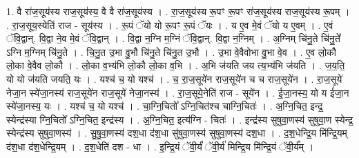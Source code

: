 \documentclass[17pt]{extarticle}
\begin{document}
1. वै रा॑ज॒सूय॑स्य राज॒सूय॑स्य॒ वै वै रा॑ज॒सूय॑स्य । . रा॒ज॒सूय॑स्य रू॒पꣳ रू॒पꣳ रा॑ज॒सूय॑स्य राज॒सूय॑स्य रू॒पम् । . रा॒ज॒सूय॒स्येति॑ राज - सूय॑स्य । . रू॒पं ॅयो यो रू॒पꣳ रू॒पं ॅयः । . य ए॒व मे॒वं ॅयो य ए॒वम् । . ए॒वं ॅवि॒द्वान्. वि॒द्वा ने॒व मे॒वं ॅवि॒द्वान् । . वि॒द्वा न॒ग्नि म॒ग्निं ॅवि॒द्वान्. वि॒द्वा न॒ग्निम् । . अ॒ग्निम् चि॑नु॒ते चि॑नु॒ते᳚ ऽग्नि म॒ग्निम् चि॑नु॒ते । . चि॒नु॒त उ॒भा वु॒भौ चि॑नु॒ते चि॑नु॒त उ॒भौ । . उ॒भा वे॒वैवोभा वु॒भा वे॒व । . ए॒व लो॒कौ लो॒का वे॒वैव लो॒कौ । . लो॒का व॒भ्य॑भि लो॒कौ लो॒का व॒भि । . अ॒भि ज॑यति जय त्य॒भ्य॑भि ज॑यति । . ज॒य॒ति॒ यो यो ज॑यति जयति॒ यः । . यश्च॑ च॒ यो यश्च॑ । . च॒ रा॒ज॒सूये॑न राज॒सूये॑न च च राज॒सूये॑न । . रा॒ज॒सूये॑ नेजा॒न स्ये॑जा॒नस्य॑ राज॒सूये॑न राज॒सूये॑ नेजा॒नस्य॑ । . रा॒ज॒सूये॒नेति॑ राज - सूये॑न । . ई॒जा॒नस्य॒ यो य ई॑जा॒न स्ये॑जा॒नस्य॒ यः । . यश्च॑ च॒ यो यश्च॑ । . चा॒ग्नि॒चितो᳚ ऽग्नि॒चित॑श्च चाग्नि॒चितः॑ । . अ॒ग्नि॒चित॒ इन्द्र॒ स्येन्द्र॑स्या ग्नि॒चितो᳚ ऽग्नि॒चित॒ इन्द्र॑स्य । . अ॒ग्नि॒चित॒ इत्य॑ग्नि - चितः॑ । . इन्द्र॑स्य सुषुवा॒णस्य॑ सुषुवा॒ण स्येन्द्र॒ स्येन्द्र॑स्य सुषुवा॒णस्य॑ । . सु॒षु॒वा॒णस्य॑ दश॒धा द॑श॒धा सु॑षुवा॒णस्य॑ सुषुवा॒णस्य॑ दश॒धा । . द॒श॒धेन्द्रि॒य मि॑न्द्रि॒यम् द॑श॒धा द॑श॒धेन्द्रि॒यम् । . द॒श॒धेति॑ दश - धा । . इ॒न्द्रि॒यं ॅवी॒र्यं॑ ॅवी॒र्य॑ मिन्द्रि॒य मि॑न्द्रि॒यं ॅवी॒र्य᳚म् । \newline
\end{document}
